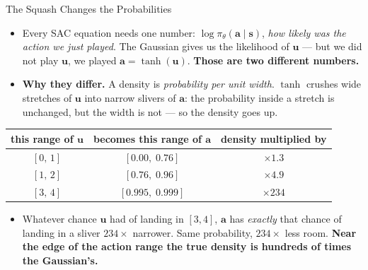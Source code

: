 \begin{frame}{The Squash Changes the Probabilities}
\small
\begin{itemize}
    \item Every SAC equation needs one number: $\log\pi_\theta(\mathbf{a}\mid\mathbf{s})$, \emph{how likely was the action we just played}. The Gaussian gives us the likelihood of $\mathbf{u}$ --- but we did not play $\mathbf{u}$, we played $\mathbf{a}=\tanh(\mathbf{u})$. \textbf{Those are two different numbers.}
    \vspace{0.5em}
    \item \textbf{Why they differ.} A density is \emph{probability per unit width}. $\tanh$ crushes wide stretches of $\mathbf{u}$ into narrow slivers of $\mathbf{a}$: the probability inside a stretch is unchanged, but the width is not --- so the density goes up.
\end{itemize}
\vspace{0.4em}
\begin{center}
\renewcommand{\arraystretch}{1.3}
\small
\begin{tabular}{ccc}
\hline
this range of $\mathbf{u}$ & becomes this range of $\mathbf{a}$ & density multiplied by \\
\hline
$[0,\,1]$ & $[0.00,\;0.76]$   & $\times 1.3$ \\
$[1,\,2]$ & $[0.76,\;0.96]$   & $\times 4.9$ \\
$[3,\,4]$ & $[0.995,\;0.999]$ & $\times 234$ \\
\hline
\end{tabular}
\end{center}
\vspace{0.5em}
\begin{itemize}
    \item[$\Rightarrow$] Whatever chance $\mathbf{u}$ had of landing in $[3,4]$, $\mathbf{a}$ has \emph{exactly} that chance of landing in a sliver $234\times$ narrower. Same probability, $234\times$ less room. \textbf{Near the edge of the action range the true density is hundreds of times the Gaussian's.}
\end{itemize}
\end{frame}

